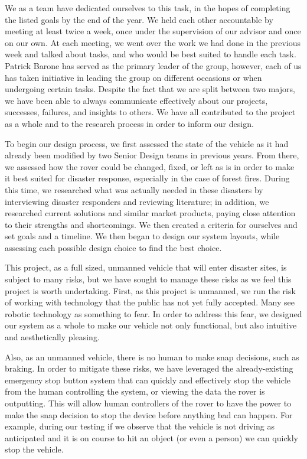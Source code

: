 We as a team have dedicated ourselves to this task, in the hopes of completing the listed goals by the end of the year. We held each other accountable by meeting at least twice a week, once under the supervision of our advisor and once on our own. At each meeting, we went over the work we had done in the previous week and talked about tasks, and who would be best suited to handle each task. Patrick Barone has served as the primary leader of the group, however, each of us has taken initiative in leading the group on different occasions or when undergoing certain tasks. Despite the fact that we are split between two majors, we have been able to always communicate effectively about our projects, successes, failures, and insights to others. We have all contributed to the project as a whole and to the research process in order to inform our design. 

To begin our design process, we first assessed the state of the vehicle as it had already been modified by two Senior Design teams in previous years. From there, we assessed how the rover could be changed, fixed, or left as is in order to make it best suited for disaster response, especially in the case of forest fires. During this time, we researched what was actually needed in these disasters by interviewing disaster responders and reviewing literature; in addition, we researched current solutions and similar market products, paying close attention to their strengths and shortcomings. We then created a criteria for ourselves and set goals and a timeline. We then began to design our system layouts, while assessing each possible design choice to find the best choice. 

This project, as a full sized, unmanned vehicle that will enter disaster sites, is subject to many risks, but we have sought to manage these risks as we feel this project is worth undertaking. First, as this project is unmanned, we run the risk of working with technology that the public has not yet fully accepted. Many see robotic technology as something to fear. In order to address this fear, we designed our system as a whole to make our vehicle not only functional, but also  intuitive and aesthetically pleasing.

Also, as an unmanned vehicle, there is no human to make snap decisions, such as braking. In order to mitigate these risks, we have leveraged the already-existing emergency stop button system that can quickly and effectively stop the vehicle from the human controlling the system, or viewing the data the rover is outputting. This will allow human controllers of the rover to have the power to make the snap decision to stop the device before anything bad can happen. For example, during our testing if we observe that the vehicle is not driving as anticipated and it is on course to hit an object (or even a person) we can quickly stop the vehicle.


